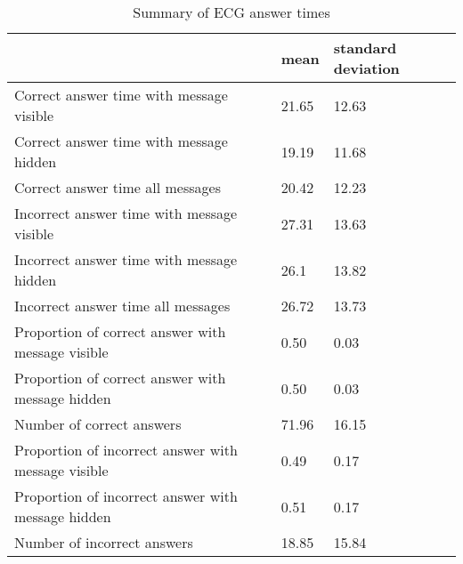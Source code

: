 \begin{table}[htbp]
\centering
\caption{Summary of ECG answer times} 
\label{meanpropsumecgtime}
                        \begin{tabular}{DEF}
  \toprule
  & mean & standard deviation \\ 
  \midrule
Correct answer time with message visible & 21.65 & 12.63 \\ 
  Correct answer time with message hidden & 19.19 & 11.68 \\ 
  Correct answer time all messages & 20.42 & 12.23 \\ 
  Incorrect answer time with message visible & 27.31 & 13.63 \\ 
  Incorrect answer time with message hidden & 26.1 & 13.82 \\ 
  Incorrect answer time all messages & 26.72 & 13.73 \\ 
  Proportion of correct answer with message visible & 0.50 & 0.03 \\ 
  Proportion of correct answer with message hidden & 0.50 & 0.03 \\ 
  Number of correct answers & 71.96 & 16.15 \\ 
  Proportion of incorrect answer with message visible & 0.49 & 0.17 \\ 
  Proportion of incorrect answer with message hidden & 0.51 & 0.17 \\ 
  Number of incorrect answers & 18.85 & 15.84 \\ 
   \bottomrule
\end{tabular}
\end{table}
